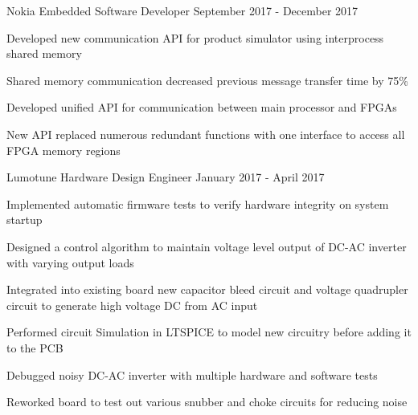 

\begin{cventries}

  \cventry
    {Nokia} %
    {Embedded Software Developer} %
    {September 2017 - December 2017} %
    {}
    {
      \begin{cvitems} %
        \item {Developed new communication API for product simulator using interprocess shared memory}
        \item {Shared memory communication decreased previous message transfer time by 75\%}
        \item {Developed unified API for communication between main processor and FPGAs}
        \item {New API replaced numerous redundant functions with one interface to access all FPGA memory regions}
      \end{cvitems}
    }

  \cventry
    {Lumotune} %
    {Hardware Design Engineer} %
    {January 2017 - April 2017} %
    {}
    {
      \begin{cvitems} %
        \item {Implemented automatic firmware tests to verify hardware integrity on system startup}
        \item {Designed a control algorithm to maintain voltage level output of DC-AC inverter with varying output loads}
        \item {Integrated into existing board new capacitor bleed circuit and voltage quadrupler circuit to generate high voltage DC from AC input}
        \item {Performed circuit Simulation in LTSPICE to model new circuitry before adding it to the PCB}
        \item {Debugged noisy DC-AC inverter with multiple hardware and software tests}
        \item {Reworked board to test out various snubber and choke circuits for reducing noise}
      \end{cvitems}
    }


\end{cventries}
